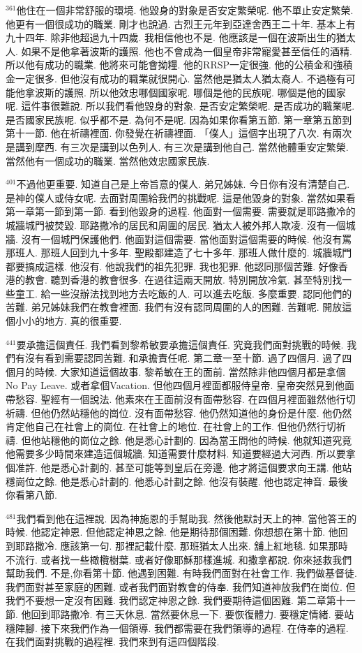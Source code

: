 \documentclass{book}
\begin{document}
$^{361}$他住在一個非常舒服的環境.
他毀身的對象是否安定繁榮呢.
他不單止安定繁榮.
他更有一個很成功的職業.
剛才也說過.
古烈王元年到亞達舍西王二十年.
基本上有九十四年.
除非他超過九十四歲.
我相信他也不是.
他應該是一個在波斯出生的猶太人.
如果不是他拿著波斯的護照.
他也不會成為一個皇帝非常寵愛甚至信任的酒精.
所以他有成功的職業.
他將來可能會拗糧.
他的RRSP一定很強.
他的公積金和強積金一定很多.
但他沒有成功的職業就很開心.
當然他是猶太人猶太裔人.
不過極有可能他拿波斯的護照.
所以他效忠哪個國家呢.
哪個是他的民族呢.
哪個是他的國家呢.
這件事很難說.
所以我們看他毀身的對象.
是否安定繁榮呢.
是否成功的職業呢.
是否國家民族呢.
似乎都不是.
為何不是呢.
因為如果你看第五節.
第一章第五節到第十一節.
他在祈禱裡面.
你發覺在祈禱裡面.
「僕人」這個字出現了八次.
有兩次是講到摩西.
有三次是講到以色列人.
有三次是講到他自己.
當然他體重安定繁榮.
當然他有一個成功的職業.
當然他效忠國家民族.

$^{401}$不過他更重要.
知道自己是上帝旨意的僕人.
弟兄姊妹.
今日你有沒有清楚自己.
是神的僕人或侍女呢.
去面對周圍給我們的挑戰呢.
這是他毀身的對象.
當然如果看第一章第一節到第一節.
看到他毀身的過程.
他面對一個需要.
需要就是耶路撒冷的城牆城門被焚毀.
耶路撒冷的居民和周圍的居民.
猶太人被外邦人欺凌.
沒有一個城牆.
沒有一個城門保護他們.
他面對這個需要.
當他面對這個需要的時候.
他沒有罵那班人.
那班人回到九十多年.
聖殿都建造了七十多年.
那班人做什麼的.
城牆城門都要搞成這樣.
他沒有.
他說我們的祖先犯罪.
我也犯罪.
他認同那個苦難.
好像香港的教會.
聽到香港的教會很多.
在過往這兩天開放.
特別開放冷氣.
甚至特別找一些童工.
給一些沒辦法找到地方去吃飯的人.
可以進去吃飯.
多麼重要.
認同他們的苦難.
弟兄姊妹我們在教會裡面.
我們有沒有認同周圍的人的困難.
苦難呢.
開放這個小小的地方.
真的很重要.

$^{441}$要承擔這個責任.
我們看到黎希敏要承擔這個責任.
究竟我們面對挑戰的時候.
我們有沒有看到需要認同苦難.
和承擔責任呢.
第二章一至十節.
過了四個月.
過了四個月的時候.
大家知道這個故事.
黎希敏在王的面前.
當然除非他四個月都是拿個No Pay Leave.
或者拿個Vacation.
但他四個月裡面都服侍皇帝.
皇帝突然見到他面帶愁容.
聖經有一個說法.
他素來在王面前沒有面帶愁容.
在四個月裡面雖然他行切祈禱.
但他仍然站穩他的崗位.
沒有面帶愁容.
他仍然知道他的身份是什麼.
他仍然肯定他自己在社會上的崗位.
在社會上的地位.
在社會上的工作.
但他仍然行切祈禱.
但他站穩他的崗位之餘.
他是悉心計劃的.
因為當王問他的時候.
他就知道究竟他需要多少時間來建造這個城牆.
知道需要什麼材料.
知道要經過大河西.
所以要拿個准許.
他是悉心計劃的.
甚至可能等到皇后在旁邊.
他才將這個要求向王講.
他站穩崗位之餘.
他是悉心計劃的.
他悉心計劃之餘.
他沒有裝醒.
他也認定神音.
最後你看第八節.

$^{481}$我們看到他在這裡說.
因為神施恩的手幫助我.
然後他默討天上的神.
當他答王的時候.
他認定神恩.
但他認定神恩之餘.
他是期待那個困難.
你想想在第十節.
他回到耶路撒冷.
應該第一句.
那裡記載什麼.
那班猶太人出來.
舖上紅地毯.
如果那時不流行.
或者找一些橄欖樹葉.
或者好像耶穌那樣進城.
和撒拿都說.
你來拯救我們幫助我們.
不是,你看第十節.
他遇到困難.
有時我們面對在社會工作.
我們做基督徒.
我們面對甚至家庭的困難.
或者我們面對教會的侍奉.
我們知道神放我們在崗位.
但我們不要想一定沒有困難.
我們認定神恩之餘.
我們要期待這個困難.
第二章第十一節.
他回到耶路撒冷.
有三天休息.
當然要休息一下.
要恢復體力.
要穩定情緒.
要站穩陣腳.
接下來我們作為一個領導.
我們都需要在我們領導的過程.
在侍奉的過程.
在我們面對挑戰的過程裡.
我們來到有這四個階段.
\end{document}
